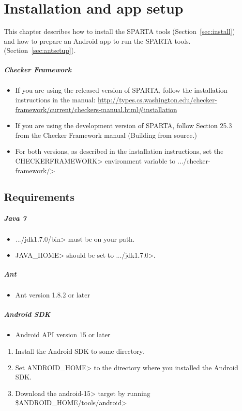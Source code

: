\htmlhr
\chapter{Installation and app setup\label{installation}}
This chapter describes how to install the SPARTA tools
(Section~\ref{sec:install}) and how to prepare an Android app to run the
SPARTA tools. (Section~\ref{sec:antsetup}).

\paragraph{Checker Framework}
\begin{itemize}
\item If you are using the released version of SPARTA, follow the installation instructions in the manual: 
\url{http://types.cs.washington.edu/checker-framework/current/checkers-manual.html#installation}
\item If you are using the development version of SPARTA,  follow Section 25.3 from the Checker Framework manual (Building from source.)
\item  For both versions, as described in the installation instructions, set the \<CHECKERFRAMEWORK>
  environment variable to \<.../checker-framework/>
\end{itemize}

\section {Requirements\label{sec:requirements}}
\paragraph{Java 7}
\begin{itemize}
 \item  \<.../jdk1.7.0/bin> must be on your path.
 \item \<JAVA\_HOME> should be set to \<.../jdk1.7.0>.
\end{itemize}

\paragraph{Ant}
\begin{itemize}
 \item Ant version 1.8.2 or later
\end{itemize}

\paragraph{Android SDK}
\begin{itemize}
 \item Android API version 15 or later
\end{itemize}
\begin{enumerate}
 \item Install the Android SDK to some directory. 
 \item Set \<ANDROID\_HOME> to the directory where you installed the
   Android SDK.
 \item Download the \<android-15> target by running \<\$ANDROID\_HOME/tools/android>
\end{enumerate}

